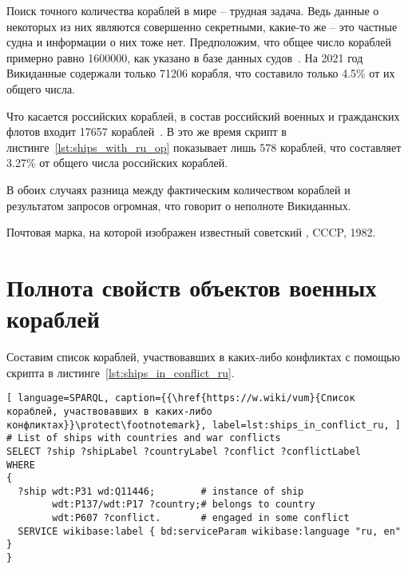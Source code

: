 \label{question:ship_1}

Поиск точного количества кораблей в мире -- трудная задача. Ведь данные о некоторых из них являются совершенно секретными, какие-то же -- это частные судна и информации о них тоже нет. Предположим, что общее число кораблей примерно равно \num{1600000}, как указано в базе данных судов~\cite{FleetMon}. На 2021 год Викиданные содержали только \num{71206} корабля, что составило только 4.5\% от их общего числа.


Что касается российских кораблей, в состав российский военных и гражданских флотов входит \num{17657} кораблей~\cite{RussianShips}. В это же время скрипт в листинге~\ref{lst:ships_with_ru_op} показывает лишь 578 кораблей, что составляет 3.27\% от общего числа российских кораблей. 

В обоих случаях разница между фактическим количеством кораблей и результатом запросов огромная, что говорит о неполноте Викиданных.


\label{question:ship_2}

\begin{marginfigure}[0.0cm]
  {
    \setlength{\fboxsep}{0pt}%
    \setlength{\fboxrule}{1pt}%
  }
  \caption[Известный советский миноносец.]{Почтовая марка, на которой изображен известный советский  , CCCP, 1982.}%
  \label{fig:grem_question}%
\end{marginfigure}

\section{Полнота свойств объектов военных кораблей}

Составим список кораблей, участвовавших в каких-либо конфликтах с помощью скрипта в листинге~\ref{lst:ships_in_conflict_ru}.

\begin{lstlisting}[ language=SPARQL, caption={{\href{https://w.wiki/vum}{Список кораблей, участвовавших в каких-либо конфликтах}}\protect\footnotemark}, label=lst:ships_in_conflict_ru, ]
# List of ships with countries and war conflicts
SELECT ?ship ?shipLabel ?countryLabel ?conflict ?conflictLabel
WHERE
{
  ?ship wdt:P31 wd:Q11446;        # instance of ship
        wdt:P137/wdt:P17 ?country;# belongs to country
        wdt:P607 ?conflict.       # engaged in some conflict
  SERVICE wikibase:label { bd:serviceParam wikibase:language "ru, en" }
}
\end{lstlisting}

